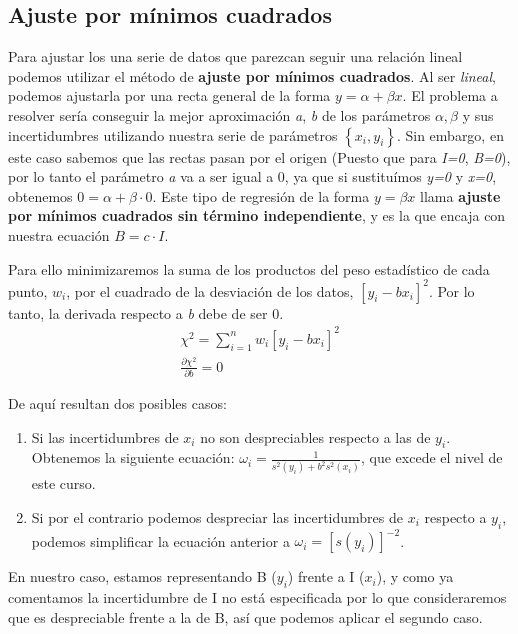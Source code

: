\documentclass[12pt, a4paper, titlepage]{article}
\begin{document}
  \subsection{Ajuste por mínimos cuadrados}

  Para ajustar los una serie de datos que parezcan seguir una relación lineal podemos utilizar el método de \textbf{ajuste por mínimos cuadrados}. Al ser \textit{lineal}, podemos ajustarla por una recta general de la forma $y = \alpha + \beta x$. El problema a resolver sería conseguir la mejor aproximación \textit{a}, \textit{b} de los parámetros $\alpha, \beta$ y sus incertidumbres utilizando nuestra serie de parámetros $\left\{ x_i, y_i \right\}$. Sin embargo, en este caso sabemos que las rectas pasan por el origen (Puesto que para \textit{I=0}, \textit{B=0}), por lo tanto el parámetro \textit{a} va a ser igual a 0, ya que si sustituímos \textit{y=0} y \textit{x=0}, obtenemos $0 = \alpha + \beta \cdot 0$. Este tipo de regresión de la forma $y = \beta x$ llama \textbf{ajuste por mínimos cuadrados sin término independiente}, y es la que encaja con nuestra ecuación $B = c \cdot I$.

  Para ello minimizaremos la suma de los productos del peso estadístico de cada punto, $w_i$, por el cuadrado de la desviación de los datos, $[y_i - bx_i]^2$. Por lo tanto, la derivada respecto a \textit{b} debe de ser 0.
  \begin{gather}
    \chi^2 = \sum^{n}_{i=1} w_i[y_i - bx_i]^2 \label{ec:chi2} \\
    \frac{\partial \chi^2}{\partial b}=0 \label{ec:deriv}
  \end{gather}

  De aquí resultan dos posibles casos:

  \begin{enumerate}
    \item Si las incertidumbres de $x_i$ no son despreciables respecto a las de $y_i$. Obtenemos la siguiente ecuación: $\omega_i=\frac{1}{s^2(y_i)+b^2s^2(x_i)}$, que excede el nivel de este curso.
    \item Si por el contrario podemos despreciar las incertidumbres de $x_i$ respecto a $y_i$, podemos simplificar la ecuación anterior a $\omega_i=[s(y_i)]^{-2}$.
  \end{enumerate}

  En nuestro caso, estamos representando B ($y_i$) frente a I ($x_i$), y como ya comentamos la incertidumbre de I no está especificada por lo que consideraremos que es despreciable frente a la de B, así que podemos aplicar el segundo caso.
\end{document}
